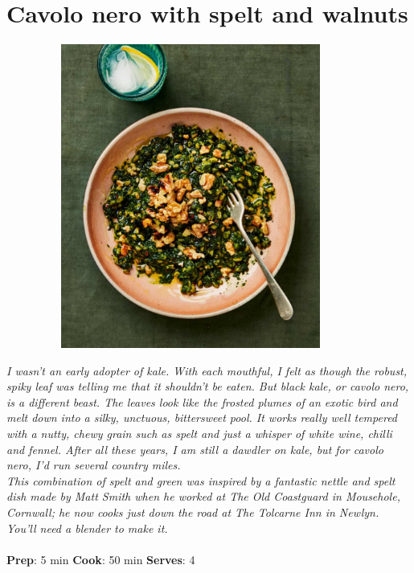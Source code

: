 \documentclass{book}
\begin{document}
\section{Cavolo nero with spelt and walnuts}
\begin{figure}
\centering\includegraphics[width=10cm,height=10cm,keepaspectratio]{Recipe_Pictures/Cavolo_nero_with_spelt_and_walnuts.png}
\end{figure}
\emph{I wasn’t an early adopter of kale. With each mouthful, I felt as though the robust, spiky leaf was telling me that it shouldn’t be eaten. But black kale, or cavolo nero, is a different beast. The leaves look like the frosted plumes of an exotic bird and melt down into a silky, unctuous, bittersweet pool. It works really well tempered with a nutty, chewy grain such as spelt and just a whisper of white wine, chilli and fennel. After all these years, I am still a dawdler on kale, but for cavolo nero, I’d run several country miles.\\ 
This combination of spelt and green was inspired by a fantastic nettle and spelt dish made by Matt Smith when he worked at The Old Coastguard in Mousehole, Cornwall; he now cooks just down the road at The Tolcarne Inn in Newlyn. You’ll need a blender to make it.}\\\\ 
\textbf{Prep}: 5 min
\textbf{Cook}: 50 min
\textbf{Serves}: 4
\end{document}
